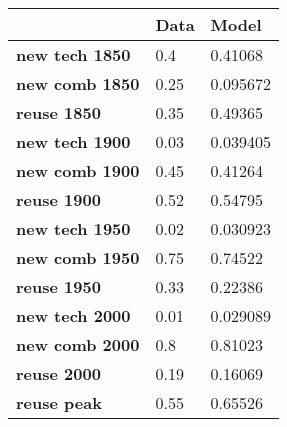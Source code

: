 \begin{tabular}{|l|l|l|}
\hline
&\textbf{Data}&\textbf{Model}\\\hline
\textbf{new tech 1850}&0.4&0.41068\\\hline
\textbf{new comb 1850}&0.25&0.095672\\\hline
\textbf{reuse 1850}&0.35&0.49365\\\hline
\textbf{new tech 1900}&0.03&0.039405\\\hline
\textbf{new comb 1900}&0.45&0.41264\\\hline
\textbf{reuse 1900}&0.52&0.54795\\\hline
\textbf{new tech 1950}&0.02&0.030923\\\hline
\textbf{new comb 1950}&0.75&0.74522\\\hline
\textbf{reuse 1950}&0.33&0.22386\\\hline
\textbf{new tech 2000}&0.01&0.029089\\\hline
\textbf{new comb 2000}&0.8&0.81023\\\hline
\textbf{reuse 2000}&0.19&0.16069\\\hline
\textbf{reuse peak}&0.55&0.65526\\\hline
\end{tabular}
